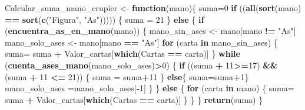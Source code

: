 \documentclass[12pt,a4paper,]{book}
\newenvironment{Shaded}{\begin{snugshade}}{\end{snugshade}}
\newcommand{\ControlFlowTok}[1]{\textcolor[rgb]{0.13,0.29,0.53}{\textbf{#1}}}
\newcommand{\DecValTok}[1]{\textcolor[rgb]{0.00,0.00,0.81}{#1}}
\newcommand{\FunctionTok}[1]{\textcolor[rgb]{0.13,0.29,0.53}{\textbf{#1}}}
\newcommand{\NormalTok}[1]{#1}
\newcommand{\OtherTok}[1]{\textcolor[rgb]{0.56,0.35,0.01}{#1}}
\newcommand{\SpecialCharTok}[1]{\textcolor[rgb]{0.81,0.36,0.00}{\textbf{#1}}}
\newcommand{\StringTok}[1]{\textcolor[rgb]{0.31,0.60,0.02}{#1}}
\numberwithin{dummy}{section}
\theoremstyle{ocrenumbox}
\theoremstyle{blacknumex}
\theoremstyle{blacknumbox}
\theoremstyle{ocrenum}
\theoremstyle{ocrenum}
\begin{document}
\begin{Shaded}
\begin{Highlighting}[]
\NormalTok{Calcular\_suma\_mano\_crupier }\OtherTok{\textless{}{-}} \ControlFlowTok{function}\NormalTok{(mano)\{}
\NormalTok{  suma}\OtherTok{=}\DecValTok{0}
  \ControlFlowTok{if}\NormalTok{ ((}\FunctionTok{all}\NormalTok{(}\FunctionTok{sort}\NormalTok{(mano) }\SpecialCharTok{==} \FunctionTok{sort}\NormalTok{(}\FunctionTok{c}\NormalTok{(}\StringTok{"Figura"}\NormalTok{, }\StringTok{"As"}\NormalTok{))))) \{}
\NormalTok{    suma }\OtherTok{=} \DecValTok{21}
\NormalTok{  \} }\ControlFlowTok{else}\NormalTok{ \{}
    \ControlFlowTok{if}\NormalTok{ (}\FunctionTok{encuentra\_as\_en\_mano}\NormalTok{(mano)) \{}
\NormalTok{      mano\_sin\_ases }\OtherTok{\textless{}{-}}\NormalTok{ mano[mano }\SpecialCharTok{!=} \StringTok{"As"}\NormalTok{]}
\NormalTok{      mano\_solo\_ases }\OtherTok{\textless{}{-}}\NormalTok{ mano[mano }\SpecialCharTok{==} \StringTok{"As"}\NormalTok{]}
      \ControlFlowTok{for}\NormalTok{ (carta }\ControlFlowTok{in}\NormalTok{ mano\_sin\_ases) \{}
\NormalTok{        suma}\OtherTok{=}\NormalTok{ suma }\SpecialCharTok{+}\NormalTok{ Valor\_cartas[}\FunctionTok{which}\NormalTok{(Cartas }\SpecialCharTok{==}\NormalTok{ carta)]}
\NormalTok{      \}}
      \ControlFlowTok{while}\NormalTok{ (}\FunctionTok{cuenta\_ases\_mano}\NormalTok{(mano\_solo\_ases)}\SpecialCharTok{\textgreater{}}\DecValTok{0}\NormalTok{) \{}
        \ControlFlowTok{if}\NormalTok{ ((suma }\SpecialCharTok{+} \DecValTok{11}\SpecialCharTok{\textgreater{}=}\DecValTok{17}\NormalTok{) }\SpecialCharTok{\&\&}\NormalTok{ (suma }\SpecialCharTok{+} \DecValTok{11} \SpecialCharTok{\textless{}=} \DecValTok{21}\NormalTok{)) \{}
\NormalTok{          suma }\OtherTok{=}\NormalTok{ suma}\SpecialCharTok{+}\DecValTok{11}
\NormalTok{        \} }\ControlFlowTok{else}\NormalTok{\{}
\NormalTok{          suma}\OtherTok{=}\NormalTok{suma}\SpecialCharTok{+}\DecValTok{1}\NormalTok{\}}
\NormalTok{        mano\_solo\_ases }\OtherTok{=}\NormalTok{mano\_solo\_ases[}\SpecialCharTok{{-}}\DecValTok{1}\NormalTok{]}
\NormalTok{      \}}
\NormalTok{    \} }
    \ControlFlowTok{else}\NormalTok{ \{}
      \ControlFlowTok{for}\NormalTok{ (carta }\ControlFlowTok{in}\NormalTok{ mano) \{}
\NormalTok{        suma}\OtherTok{=}\NormalTok{ suma }\SpecialCharTok{+}\NormalTok{ Valor\_cartas[}\FunctionTok{which}\NormalTok{(Cartas }\SpecialCharTok{==}\NormalTok{ carta)]}
\NormalTok{      \}}
\NormalTok{    \}}
\NormalTok{  \}}
  \FunctionTok{return}\NormalTok{(suma)}
\NormalTok{\}}


\end{Highlighting}
\end{Shaded}
\end{document}
